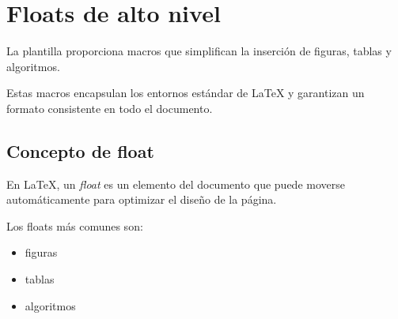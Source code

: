 %
%
%
%
%
%
%
%
%


\chapter{Floats de alto nivel}

La plantilla proporciona macros que simplifican la
inserción de figuras, tablas y algoritmos.

Estas macros encapsulan los entornos estándar de
\LaTeX{} y garantizan un formato consistente en
todo el documento.




\section{Concepto de float}

\begin{definitionbox}[Float]
En \LaTeX{}, un \textit{float} es un elemento del
documento que puede moverse automáticamente para
optimizar el diseño de la página.
\end{definitionbox}

Los floats más comunes son:

\begin{itemize}

\item figuras
\item tablas
\item algoritmos

\end{itemize}



